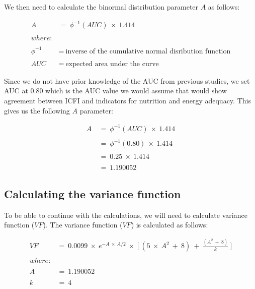 \documentclass[12pt,a4paper]{article}
\theoremstyle{definition}
\theoremstyle{definition}
\theoremstyle{definition}
\theoremstyle{remark}
\begin{document}
We then need to calculate the binormal distribution parameter \(A\) as
follows:

\[ \begin{aligned}
A ~ & = ~ \phi ^ {-1}(AUC) ~ \times ~ 1.414 \\
\\
where: & \\
\\
\phi ^ {-1} ~ & = ~ \text{inverse of the cumulative normal disribution function} \\
\\
AUC ~ & = ~ \text{expected area under the curve}
\end{aligned} \]

Since we do not have prior knowledge of the AUC from previous studies,
we set AUC at 0.80 which is the AUC value we would assume that would
show agreement between ICFI and indicators for nutrition and energy
adequacy. This gives us the following \(A\) parameter:

\[ \begin{aligned}
A ~ & = ~ \phi ^ {-1}(AUC) ~ \times ~ 1.414 \\
\\
& = ~ \phi ^ {-1}(0.80) ~ \times ~ 1.414 \\
\\
& = ~ 0.25 ~ \times ~ 1.414 \\
\\
& = ~ 1.190052
\end{aligned} \]

\hypertarget{calculating-the-variance-function}{%
\subsection{Calculating the variance
function}\label{calculating-the-variance-function}}

To be able to continue with the calculations, we will need to calculate
variance function (\(VF\)). The variance function (\(VF\)) is calculated
as follows:

\[ \begin{aligned}
VF ~ & = ~ 0.0099 ~ \times ~ e ^ {-A ~ \times ~ A/2} ~ \times ~ \Bigg [ ~ (5 ~ \times ~ A ^ 2 ~ + ~ 8) ~ + ~ \frac{(A ^ 2 ~ + ~ 8)}{k} ~ \Bigg ] \\
\\
where: & \\
\\
A ~ & = ~ 1.190052 \\
\\
k ~ & = ~ 4
\end{aligned}\]
\end{document}
